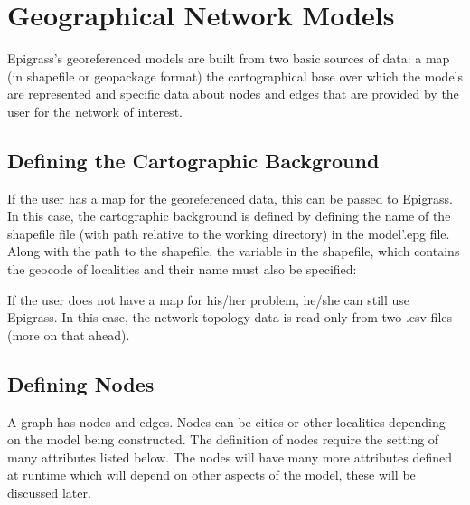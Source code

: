 \documentclass[letterpaper,10pt,english]{sphinxmanual}
\begin{document}
\section{Geographical Network Models}
\label{\detokenize{overview:geographical-network-models}}
\ignorespaces 
Epigrass’s geo\sphinxhyphen{}referenced models are built from two basic sources of data: a map (in shapefile or geopackage format)
the cartographical base over which the models are represented and specific data about nodes and edges that are provided
by the user for the network of interest.


\subsection{Defining the Cartographic Background}
\label{\detokenize{overview:defining-the-cartographic-background}}
If the user has a map for the geo\sphinxhyphen{}referenced data, this can be passed to Epigrass. In this case, the cartographic
background is defined by defining the name of the shapefile file (with path relative to the working directory) in
the model’.epg file. Along with the path to the shapefile,  the variable in the shapefile, which contains the geocode
of localities and their name must also be specified:

\begin{sphinxVerbatim}[commandchars=\\\{\}]
   \PYG{p}{[}\PYG{p}{]}
\end{sphinxVerbatim}

If the user does not have a map for his/her problem, he/she can still use Epigrass. In this case, the network topology data is
read only from two .csv files (more on that ahead).

\ignorespaces 

\subsection{Defining Nodes}
\label{\detokenize{overview:defining-nodes}}\label{\detokenize{overview:index-1}}
A graph has nodes and edges. Nodes can be cities or other localities depending on the model being constructed.
The definition of nodes require the setting of many attributes listed below. The nodes will have many more attributes
defined at run\sphinxhyphen{}time which will depend on other aspects of the model, these will be discussed later.
\end{document}
